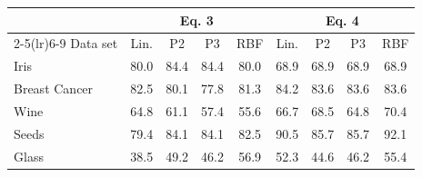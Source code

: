 \begin{tabular}{@{}lcccccccc@{}}
\toprule
 & \multicolumn{4}{c}{Eq. 3} & \multicolumn{4}{c}{Eq. 4} \\
\cmidrule(lr){2-5}\cmidrule(lr){6-9}
Data set & Lin. & P2 & P3 & RBF & Lin. & P2 & P3 & RBF \\
\midrule
Iris & 80.0 & 84.4 & 84.4 & 80.0 & 68.9 & 68.9 & 68.9 & 68.9 \\
Breast Cancer & 82.5 & 80.1 & 77.8 & 81.3 & 84.2 & 83.6 & 83.6 & 83.6 \\
Wine & 64.8 & 61.1 & 57.4 & 55.6 & 66.7 & 68.5 & 64.8 & 70.4 \\
Seeds & 79.4 & 84.1 & 84.1 & 82.5 & 90.5 & 85.7 & 85.7 & 92.1 \\
Glass & 38.5 & 49.2 & 46.2 & 56.9 & 52.3 & 44.6 & 46.2 & 55.4 \\
\bottomrule
\end{tabular}
